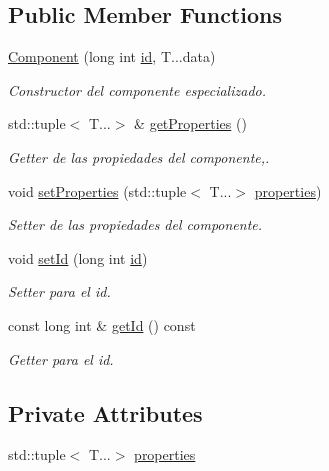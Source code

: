 \subsection*{Public Member Functions}
\begin{DoxyCompactItemize}
\item 
\hyperlink{classant_1_1_component_a6116af875d9cfb98a00c8d45644069a1}{Component} (long int \hyperlink{classant_1_1base_component_a27d4ac318ff9a3aa9e7be2391dbb85be}{id}, T...\+data)
\begin{DoxyCompactList}\small\item\em Constructor del componente especializado. \end{DoxyCompactList}\item 
std\+::tuple$<$ T...$>$ \& \hyperlink{classant_1_1_component_acbf5db9e0be87eba019e193240ea9982}{get\+Properties} ()
\begin{DoxyCompactList}\small\item\em Getter de las propiedades del componente,. \end{DoxyCompactList}\item 
void \hyperlink{classant_1_1_component_a99536facf527f1df3c366a6f9f425fe6}{set\+Properties} (std\+::tuple$<$ T...$>$ \hyperlink{classant_1_1_component_af9e7b330e3e1e3599b1e81936a139913}{properties})
\begin{DoxyCompactList}\small\item\em Setter de las propiedades del componente. \end{DoxyCompactList}\item 
void \hyperlink{classant_1_1base_component_ae033339154fcd331683f5864741b9bba}{set\+Id} (long int \hyperlink{classant_1_1base_component_a27d4ac318ff9a3aa9e7be2391dbb85be}{id})
\begin{DoxyCompactList}\small\item\em Setter para el id. \end{DoxyCompactList}\item 
const long int \& \hyperlink{classant_1_1base_component_a497d74829d42df8216d4ea0c2d351335}{get\+Id} () const 
\begin{DoxyCompactList}\small\item\em Getter para el id. \end{DoxyCompactList}\end{DoxyCompactItemize}
\subsection*{Private Attributes}
\begin{DoxyCompactItemize}
\item 
std\+::tuple$<$ T...$>$ \hyperlink{classant_1_1_component_af9e7b330e3e1e3599b1e81936a139913}{properties}
\end{DoxyCompactItemize}


